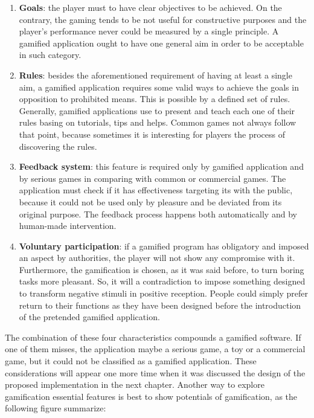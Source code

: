 \begin{enumerate}
	\item  \textbf{Goals}: the player must to have clear objectives to be achieved. On the contrary, the gaming tends to be not useful for constructive purposes and the player's performance never could be measured by a single principle. A gamified application ought to have one general aim in order to be acceptable in such category.
	\item \textbf{Rules}: besides the aforementioned requirement of having at least a single aim, a gamified application requires some valid ways to achieve the goals in opposition to prohibited means. This is possible by a defined set of rules. Generally, gamified applications use to present and teach each one of their rules basing on tutorials, tips and helps. Common games not always follow that point, because sometimes it is interesting for players the process of discovering the rules.
	\item \textbf{Feedback system}: this feature is required only by gamified  application and by serious games in comparing with common or commercial games. The application must check if it has effectiveness targeting its with the public, because it could not be used only by pleasure and be deviated from its original purpose. The feedback process happens both  automatically and by human-made intervention.
	\item \textbf{Voluntary participation}: if a gamified program has obligatory and imposed an aspect  by authorities, the player will not show any compromise with it. Furthermore, the gamification is chosen, as it was said before, to turn boring tasks more pleasant. So, it will a contradiction to impose something designed to transform negative stimuli in positive reception. People could simply prefer return to their functions as they have been designed before the introduction of the pretended gamified application.
\end{enumerate}

The combination of these four characteristics compounds a gamified software. If one of them misses, the application maybe a serious game, a toy or a commercial game, but it could not be classified as a gamified application. These considerations will appear one more time when it was discussed the design of the proposed implementation in the next chapter. Another way to explore gamification essential features is best to show potentials of gamification, as the following figure summarize:

